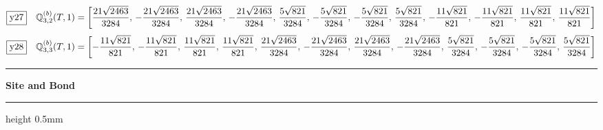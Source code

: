 \documentclass[fleqn,10pt,landscape]{jsarticle}
\begin{document}
\begin{dmath*}
\fbox{y27}\quad \mathbb{Q}_{3,2}^{(b)}(T,1)=\left[ \frac{21 \sqrt{2463}}{3284},\, - \frac{21 \sqrt{2463}}{3284},\, \frac{21 \sqrt{2463}}{3284},\, - \frac{21 \sqrt{2463}}{3284},\, \frac{5 \sqrt{821}}{3284},\, - \frac{5 \sqrt{821}}{3284},\, - \frac{5 \sqrt{821}}{3284},\, \frac{5 \sqrt{821}}{3284},\, - \frac{11 \sqrt{821}}{821},\, - \frac{11 \sqrt{821}}{821},\, \frac{11 \sqrt{821}}{821},\, \frac{11 \sqrt{821}}{821} \right]
\end{dmath*}
\begin{dmath*}
\fbox{y28}\quad \mathbb{Q}_{3,3}^{(b)}(T,1)=\left[ - \frac{11 \sqrt{821}}{821},\, - \frac{11 \sqrt{821}}{821},\, \frac{11 \sqrt{821}}{821},\, \frac{11 \sqrt{821}}{821},\, \frac{21 \sqrt{2463}}{3284},\, - \frac{21 \sqrt{2463}}{3284},\, \frac{21 \sqrt{2463}}{3284},\, - \frac{21 \sqrt{2463}}{3284},\, \frac{5 \sqrt{821}}{3284},\, - \frac{5 \sqrt{821}}{3284},\, - \frac{5 \sqrt{821}}{3284},\, \frac{5 \sqrt{821}}{3284} \right]
\end{dmath*}
\vspace{5mm}
\noindent \rule[0.5mm]{5mm}{0.5mm}\hspace{3mm}\textbf{Site and Bond}\hspace{3mm}\leaders\hrule height 0.5mm\hfill\kern0pt
\vspace{3mm}
\end{document}
